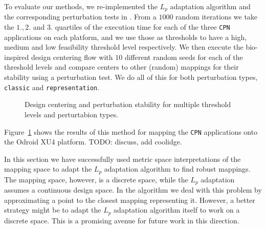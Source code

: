 To evaluate our methods, we re-implemented the $L_p$ adaptation algorithm and the corresponding perturbation tests in \mocasin. 
From a $1000$ random iterations we take the $1.,2.$ and $3.$ quartiles of the execution time for each of the three \texttt{CPN} applications on each platform, and we use those as thresholds to have a high, medium and low feasibility threshold level respectively.
We then execute the bio-inspired design centering flow with $10$ different random seeds for each of the threshold levels and compare centers to other (random) mappings for their stability using a perturbation test.
We do all of this for both perturbation types, \texttt{classic} and \texttt{representation}.

\begin{figure}[h]
	\centering
	\caption{Design centering and perturbation stability for multiple threshold levels and perturtabion types.}
	\label{fig:design_centering_exynos}
\end{figure}

Figure~\ref{fig:design_centering_exynos} shows the results of this method for mapping the \texttt{CPN} applications onto the Odroid XU4 platform.
TODO: discuss, add coolidge.

In this section we have successfully used metric space interpretations of the mapping space to adapt the $L_p$ adaptation algorithm to find robust mappings.
The mapping space, however, is a discrete space, while the $L_p$ adaptation assumes a continuous design space.
In the algorithm we deal with this problem by approximating a point to the closest mapping representing it.
However, a better strategy might be to adapt the $L_p$ adaptation algorithm itself to work on a discrete space.
This is a promising avenue for future work in this direction.